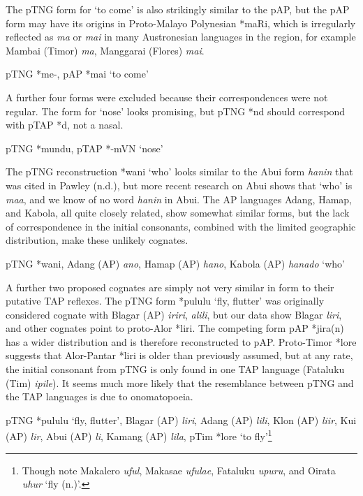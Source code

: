The pTNG form for `to come' is also strikingly similar to the pAP, but the pAP form may have its origins in Proto-Malayo Polynesian *maRi, which is irregularly reflected as \textit{ma }or \textit{mai }in many Austronesian languages in the region, for example Mambai (Timor) \textit{ma}, Manggarai (Flores) \textit{mai}.

\ea%
\label{ex:4:51}
\upshape    pTNG *me-, pAP *mai `to come'  
\z

A further four forms were excluded because their correspondences were not regular. The form for `nose' looks promising, but pTNG *nd should correspond with pTAP *d, not a nasal.

\ea%
\label{ex:4:52}
\upshape    pTNG *mundu, pTAP *-mVN `nose'   
\z

The pTNG reconstruction *wani `who' looks similar to the Abui form \textit{hanin} that was cited in Pawley (n.d.), but more recent research on Abui shows that `who' is \textit{maa}, and we know of  no word \textit{hanin} in Abui. The AP languages Adang, Hamap, and Kabola, all quite closely related, show somewhat similar forms, but the lack of correspondence in the initial consonants, combined with the limited geographic distribution, make these unlikely cognates.

\ea%
\label{ex:4:53}
\upshape    pTNG *wani, Adang (AP) \textit{ano}, Hamap (AP) \textit{hano}, Kabola (AP) \textit{hanado} `who' 
\z

A further two proposed cognates are simply not very similar in form to their putative TAP reflexes. The pTNG form *pululu `fly, flutter' was originally considered cognate with Blagar (AP) \textit{iriri}, \textit{alili}, but our data show Blagar \textit{liri}, and other cognates point to proto-Alor *liri. The competing form pAP *jira(n) has a wider distribution and is therefore reconstructed to pAP. Proto-Timor *lore suggests that Alor-Pantar *liri is older than previously assumed, but at any rate, the initial consonant from pTNG is only found in one TAP language (Fataluku (Tim) \textit{ipile}). It seems much more likely that the resemblance between pTNG and the TAP languages is due to onomatopoeia.

\ea%
\label{ex:4:54}
\upshape    pTNG *pululu `fly, flutter', Blagar (AP) \textit{liri}, Adang (AP) \textit{lili}\textit{{\textglotstop}}, Klon (AP) \textit{liir}, Kui (AP) \textit{lir}, Abui (AP) \textit{li}\textit{{\textglotstop}}, Kamang (AP) \textit{lila}, pTim *lore `to fly'\footnote{Though note Makalero \textit{uful}, Makasae \textit{ufulae}, Fataluku \textit{upuru}, and Oirata \textit{uhur} `fly (n.)'. }  
\z

